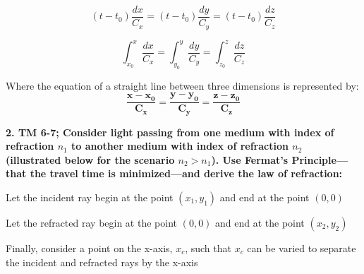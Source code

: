 \documentclass[12pt]{article}
\begin{document}
$$
(t - t_0)\frac{dx}{C_x} =
(t - t_0)\frac{dy}{C_y} =
(t - t_0)\frac{dz}{C_z}
$$

$$
\int^{x}_{x_0} \frac{dx}{C_x} =
\int^{y}_{y_0} \frac{dy}{C_y} =
\int^{z}_{z_0} \frac{dz}{C_z}
$$


Where the equation of a straight line between three dimensions is represented by:
$$
\boldsymbol{
\frac{x - x_0}{C_x} =
\frac{y - y_0}{C_y} =
\frac{z - z_0}{C_z}
}
$$


\newpage
\textbf{2. TM 6-7; Consider light passing from one medium with index of refraction $n_1$ to another medium with index of refraction $n_2$ (illustrated below for the scenario $n_2 > n_1$). Use Fermat’s Principle—that the travel time is minimized—and derive the law of refraction:}



\vspace{1cm}

Let the incident ray begin at the point $(x_1, y_1)$ and end at the point $(0, 0)$
\vspace{0.25cm}

Let the refracted ray begin at the point $(0, 0)$ and end at the point $(x_2, y_2)$ 
\vspace{0.25cm}

Finally, consider a point on the x-axis, $x_c$, such that $x_c$ can be varied to separate the incident and refracted rays by the x-axis
\vspace{0.25cm}
\end{document}
